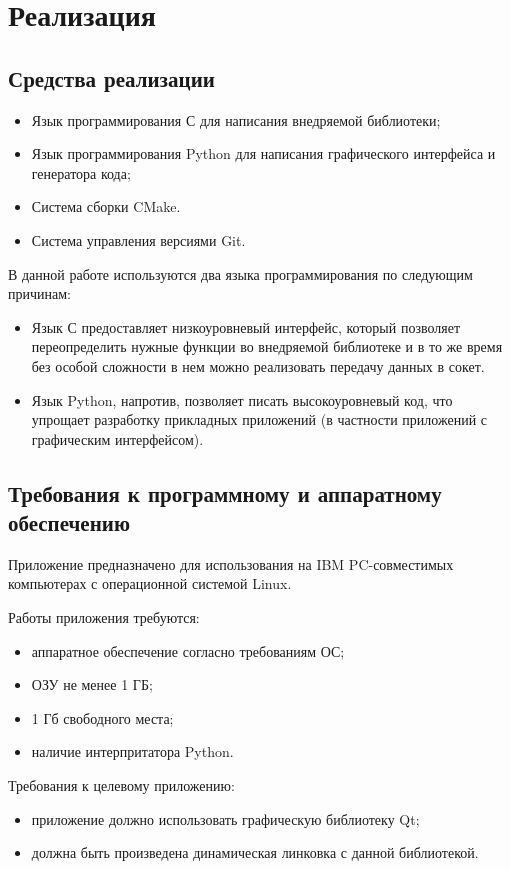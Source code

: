 \chapter{Реализация}

\section{Средства реализации}

\begin{itemize}
	\item Язык программирования С для написания внедряемой библиотеки;
	\item Язык программирования Python для написания графического интерфейса и
		генератора кода;
	\item Система сборки CMake.
	\item Система управления версиями Git.
\end{itemize}

В данной работе используются два языка программирования по следующим причинам:

\begin{itemize}
	\item Язык С предоставляет низкоуровневый интерфейс, который позволяет
		переопределить нужные функции во внедряемой библиотеке и в то же время
		без особой сложности в нем можно реализовать передачу данных в сокет.
	\item Язык Python, напротив, позволяет писать высокоуровневый код, что
		упрощает разработку прикладных приложений (в частности приложений с
		графическим интерфейсом).
\end{itemize}

\section{Требования к программному и аппаратному обеспечению}

Приложение предназначено для использования на IBM PC-совместимых компьютерах с
операционной системой Linux.

Работы приложения требуются:

\begin{itemize}
	\item аппаратное обеспечение согласно требованиям ОС;
	\item ОЗУ не менее 1 ГБ;
	\item 1 Гб свободного места;
	\item наличие интерпритатора Python.
\end{itemize}

Требования к целевому приложению:

\begin{itemize}
	\item приложение должно использовать графическую библиотеку Qt;
	\item должна быть произведена динамическая линковка с данной библиотекой.
\end{itemize}
